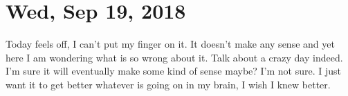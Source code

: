 \section{Wed, Sep 19, 2018}

Today feels off, I can't put my finger on it. It doesn't make any sense and yet here
I am wondering what is so wrong about it. Talk about a crazy day indeed. I'm sure it
will eventually make some kind of sense maybe? I'm not sure. I just want it to get
better whatever is going on in my brain, I wish I knew better.

